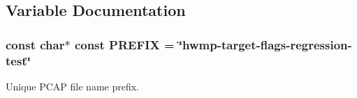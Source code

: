 \subsection{Variable Documentation}
\subsubsection[{\texorpdfstring{P\+R\+E\+F\+IX}{PREFIX}}]{\setlength{\rightskip}{0pt plus 5cm}const char$\ast$ const P\+R\+E\+F\+IX = \char`\"{}hwmp-\/target-\/flags-\/regression-\/{\bf test}\char`\"{}}\hypertarget{hwmp-target-flags-regression_8cc_a61dc66981fa47bfd0066a57a487c599c}{}\label{hwmp-target-flags-regression_8cc_a61dc66981fa47bfd0066a57a487c599c}


Unique P\+C\+AP file name prefix. 


